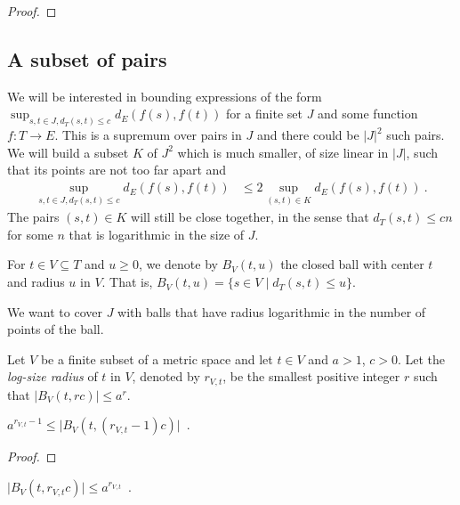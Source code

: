 \begin{proof}\leanok

\end{proof}


\subsection{A subset of pairs}

We will be interested in bounding expressions of the form $\sup_{s,t\in J, d_T(s,t) \le c} d_E(f(s), f(t))$ for a finite set $J$ and some function $f : T \to E$.
This is a supremum over pairs in $J$ and there could be $\vert J \vert^2$ such pairs.
We will build a subset $K$ of $J^2$ which is much smaller, of size linear in $\vert J \vert$, such that its points are not too far apart and
\begin{align*}
  \sup_{s,t\in J, d_T(s,t) \le c} d_E(f(s), f(t))
  & \le 2 \sup_{(s,t) \in K} d_E(f(s), f(t))
  \: .
\end{align*}
The pairs $(s, t) \in K$ will still be close together, in the sense that $d_T(s, t) \le c n$ for some $n$ that is logarithmic in the size of $J$.

For $t \in V \subseteq T$ and $u\ge 0$, we denote by $B_V(t, u)$ the closed ball with center $t$ and radius $u$ in $V$.
That is, $B_V(t, u) = \{s \in V \mid d_T(s, t) \le u\}$.

We want to cover $J$ with balls that have radius logarithmic in the number of points of the ball.

\begin{definition}\label{def:logSizeRadius}
  \leanok
Let $V$ be a finite subset of a metric space and let $t \in V$ and $a > 1$, $c > 0$.
Let the \emph{log-size radius} of $t$ in $V$, denoted by $r_{V,t}$, be the smallest positive integer $r$ such that $\vert B_V(t, r c) \vert \le a^{r}$.
\end{definition}


\begin{lemma}\label{lem:card_logSizeRadius_ge}
  \leanok
$a^{r_{V,t}-1} \le \vert B_V(t, (r_{V,t}-1)c) \vert$~.
\end{lemma}

\begin{proof}\leanok

\end{proof}


\begin{lemma}\label{lem:card_logSizeRadius_le}
  \leanok
$\vert B_V(t, r_{V,t}c) \vert \le a^{r_{V,t}}$~.
\end{lemma}

